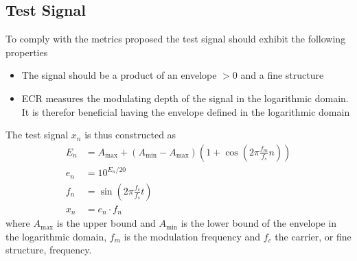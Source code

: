 \documentclass[../main2.tex]{subfiles}
\begin{document}
\subsection{Test Signal} \label{test_signal}
To comply with the metrics proposed the test signal should exhibit the following properties
\begin{itemize}
\item{The signal should be a product of an envelope $> 0$ and a fine structure}
\item{ECR measures the modulating depth of the signal in the logarithmic domain. It is therefor beneficial having the envelope defined in the logarithmic domain}
\end{itemize}

The test signal $x_n$ is thus constructed as
\begin{align}
E_n &= A_{\text{max}} + \left(A_{\text{min}} - A_{\text{max}}\right)\left(1+\cos \left(2\pi\frac{f_m}{f_s}n\right)\right)\\
e_n &= 10^{E_n/20}\\
f_n &= \sin \left( 2\pi \frac{f_c}{f_s} t\right) \\
x_n &= e_n \cdot f_n
\end{align}
where $A_{\text{max}}$ is the upper bound and $A_{\text{min}}$ is the lower bound of the envelope in the logarithmic domain, $f_m$ is the modulation frequency and $f_c$ the carrier, or fine structure, frequency.
\end{document}
